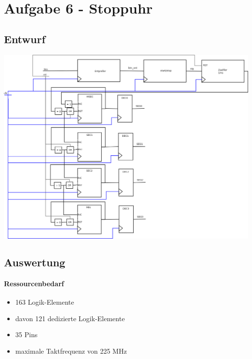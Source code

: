 \section{Aufgabe 6 - Stoppuhr}
\subsection{Entwurf}
\includegraphics[width=1\textwidth]{resources/06-stopuhr.png}
\subsection{Auswertung}
	\paragraph{Ressourcenbedarf}
	\begin{itemize} 
	\item 163 Logik-Elemente
	\item davon 121 dedizierte Logik-Elemente
	\item 35 Pins 
	\item maximale Taktfrequenz von 225 MHz
	\end{itemize}
